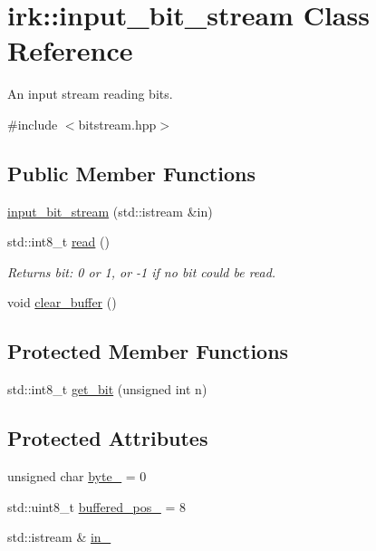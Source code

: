 \hypertarget{classirk_1_1input__bit__stream}{}\section{irk\+:\+:input\+\_\+bit\+\_\+stream Class Reference}
\label{classirk_1_1input__bit__stream}


An input stream reading bits.  




{\ttfamily \#include $<$bitstream.\+hpp$>$}

\subsection*{Public Member Functions}
\begin{DoxyCompactItemize}
\item 
\mbox{\hyperlink{classirk_1_1input__bit__stream_a9265f80a24bee081fdade3d7950f4c12}{input\+\_\+bit\+\_\+stream}} (std\+::istream \&in)
\item 
std\+::int8\+\_\+t \mbox{\hyperlink{classirk_1_1input__bit__stream_a5d0df3f69ce0887e5f93fc15a59f9b96}{read}} ()
\begin{DoxyCompactList}\small\item\em Returns bit\+: 0 or 1, or -\/1 if no bit could be read. \end{DoxyCompactList}\item 
void \mbox{\hyperlink{classirk_1_1input__bit__stream_a470b904afe60107c49105a5d15bd86e2}{clear\+\_\+buffer}} ()
\end{DoxyCompactItemize}
\subsection*{Protected Member Functions}
\begin{DoxyCompactItemize}
\item 
std\+::int8\+\_\+t \mbox{\hyperlink{classirk_1_1input__bit__stream_a8e85aa977d3b47cdb8adc96c688795f3}{get\+\_\+bit}} (unsigned int n)
\end{DoxyCompactItemize}
\subsection*{Protected Attributes}
\begin{DoxyCompactItemize}
\item 
unsigned char \mbox{\hyperlink{classirk_1_1input__bit__stream_a18d1743fba8de3f3ff758f991790f3d3}{byte\+\_\+}} = 0
\item 
std\+::uint8\+\_\+t \mbox{\hyperlink{classirk_1_1input__bit__stream_a1d7126f65850a4f4e7775d8880fe0609}{buffered\+\_\+pos\+\_\+}} = 8
\item 
std\+::istream \& \mbox{\hyperlink{classirk_1_1input__bit__stream_a3513799a1ea6025e9e6fc2c83a530b6a}{in\+\_\+}}
\end{DoxyCompactItemize}


